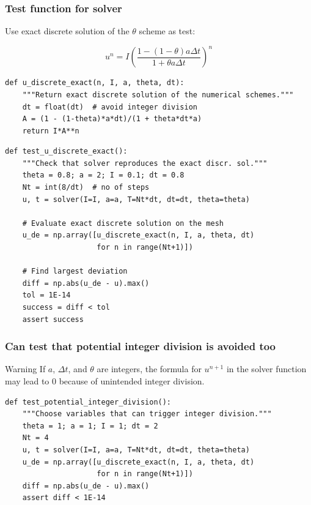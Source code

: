 \documentclass{beamer}
\begin{document}
\begin{frame}
\frametitle{Test function for solver}

Use exact discrete solution of the $\theta$ scheme as test:

\[ u^n = I\left(
\frac{1 - (1-\theta) a\Delta t}{1 + \theta a \Delta t}
\right)^n\]

\begin{verbatim}
def u_discrete_exact(n, I, a, theta, dt):
    """Return exact discrete solution of the numerical schemes."""
    dt = float(dt)  # avoid integer division
    A = (1 - (1-theta)*a*dt)/(1 + theta*dt*a)
    return I*A**n
\end{verbatim}

\begin{verbatim}
def test_u_discrete_exact():
    """Check that solver reproduces the exact discr. sol."""
    theta = 0.8; a = 2; I = 0.1; dt = 0.8
    Nt = int(8/dt)  # no of steps
    u, t = solver(I=I, a=a, T=Nt*dt, dt=dt, theta=theta)

    # Evaluate exact discrete solution on the mesh
    u_de = np.array([u_discrete_exact(n, I, a, theta, dt)
                     for n in range(Nt+1)])

    # Find largest deviation
    diff = np.abs(u_de - u).max()
    tol = 1E-14
    success = diff < tol
    assert success
\end{verbatim}
\end{frame}

\begin{frame}
\frametitle{Can test that potential integer division is avoided too}

\begin{block}{Warning}
If $a$, $\Delta t$, and
$\theta$ are integers, the formula for $u^{n+1}$ in the solver
function may lead to 0 because of unintended integer division.
\end{block}

\begin{verbatim}
def test_potential_integer_division():
    """Choose variables that can trigger integer division."""
    theta = 1; a = 1; I = 1; dt = 2
    Nt = 4
    u, t = solver(I=I, a=a, T=Nt*dt, dt=dt, theta=theta)
    u_de = np.array([u_discrete_exact(n, I, a, theta, dt)
                     for n in range(Nt+1)])
    diff = np.abs(u_de - u).max()
    assert diff < 1E-14
\end{verbatim}
\end{frame}
\end{document}
